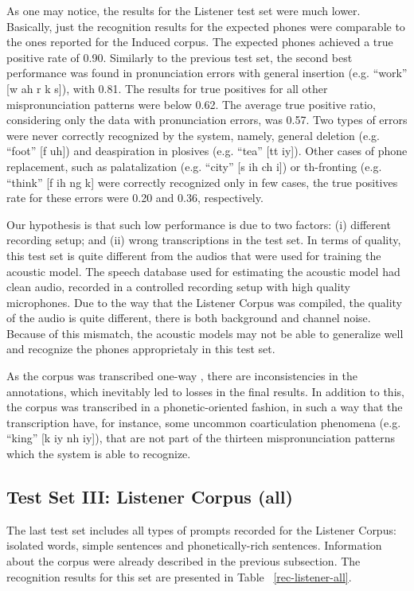 \documentclass[twocolumn]{bmcart}%
\begin{document}
As one may notice, the results for the Listener test set were much lower. Basically, just the recognition results for the expected phones were comparable to the ones reported for the Induced corpus. The expected phones achieved a true positive rate of 0.90. Similarly to the previous test set, the second best performance was found in pronunciation errors with general insertion (e.g. ``work'' [w ah r k s]), with 0.81. The results for true positives for all other mispronunciation patterns were below 0.62. The average true positive ratio, considering only the data with pronunciation errors, was 0.57. Two types of errors were never correctly recognized by the system, namely, general deletion (e.g. ``foot'' [f uh]) and deaspiration in plosives (e.g. ``tea'' [tt iy]). Other cases of phone replacement, such as palatalization (e.g. ``city'' [s ih ch i]) or th-fronting (e.g. ``think'' [f ih ng k] were correctly recognized only in few cases, the true positives rate for these errors were 0.20 and 0.36, respectively.

Our hypothesis is that such low performance is due to two factors: (i) different recording setup; and (ii) wrong transcriptions in the test set. In terms of quality, this test set is quite different from the audios that were used for training the acoustic model. The speech database used for estimating the acoustic model had clean audio, recorded in a controlled recording setup with high quality microphones. Due to the way that the Listener Corpus was compiled, the quality of the audio is quite different, there is both background and channel noise. Because of this mismatch, the acoustic models may not be able to generalize well and recognize the phones approprietaly in this test set. 

As the corpus was transcribed one-way \cite{Shulby2015}, there are inconsistencies in the annotations, which inevitably led to losses in the final results. In addition to this, the corpus was transcribed in a phonetic-oriented fashion, in such a way that the transcription have, for instance, some uncommon coarticulation phenomena (e.g. ``king'' [k iy nh iy]), that are not part of the thirteen mispronunciation patterns which the system is able to recognize. 

\subsection{Test Set III: Listener Corpus (all)}

The last test set includes all types of prompts recorded for the Listener Corpus: isolated words, simple sentences and phonetically-rich sentences. Information about the corpus were already described in the previous subsection. The recognition results for this set are presented in Table ~\ref{rec-listener-all}.
\end{document}
